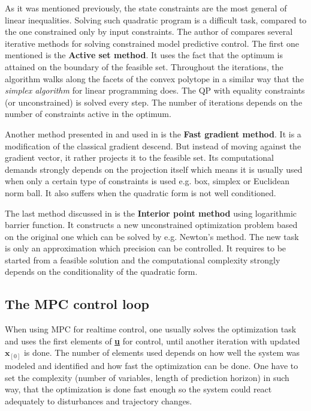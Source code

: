 As it was mentioned previously, the state constraints are the most general of linear inequalities. Solving such quadratic program is a difficult task, compared to the one constrained only by input constraints. The author of \citep{mikulas2013} compares several iterative methods for solving constrained model predictive control. The first one mentioned is the \textbf{Active set method}. It uses the fact that the optimum is attained on the boundary of the feasible set. Throughout the iterations, the algorithm walks along the facets of the convex polytope in a similar way that the \textit{simplex algorithm} for linear programming does. The QP with equality constraints (or unconstrained) is solved every step. The number of iterations depends on the number of constraints active in the optimum.

Another method presented in \citep{mikulas2013} and used in \citep{zometa2012segway} is the \textbf{Fast gradient method}. It is a modification of the classical gradient descend. But instead of moving against the gradient vector, it rather projects it to the feasible set. Its computational demands strongly depends on the projection itself which means it is usually used when only a certain type of constraints is used e.g. box, simplex or Euclidean norm ball. It also suffers when the quadratic form is not well conditioned.

The last method discussed in \citep{mikulas2013} is the \textbf{Interior point method} using logarithmic barrier function. It constructs a new unconstrained optimization problem based on the original one which can be solved by e.g. Newton's method. The new task is only an approximation which precision can be controlled. It requires to be started from a feasible solution and the computational complexity strongly depends on the conditionality of the quadratic form.

\subsection{The MPC control loop}
\label{cap:qmpc_control_loop}

When using MPC for realtime control, one usually solves the optimization task and uses the first elements of \textbf{\underline{u}} for control, until another iteration with updated $\textbf{x}_{[0]}$ is done. The number of elements used depends on how well the system was modeled and identified and how fast the optimization can be done. One have to set the complexity (number of variables, length of prediction horizon) in such way, that the optimization is done fast enough so the system could react adequately to disturbances and trajectory changes.


